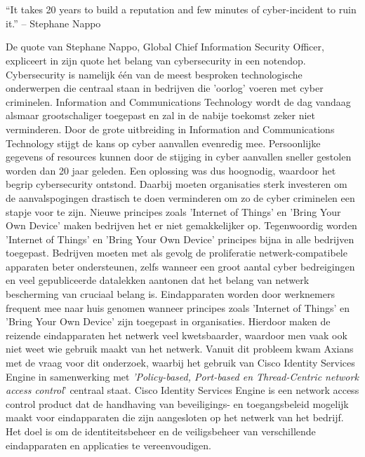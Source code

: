 
\chapter{}
\label{ch:inleiding}

\begin{displayquote}
	“It takes 20 years to build a reputation and few minutes of cyber-incident to ruin it.” – Stephane Nappo
\end{displayquote}

De quote van Stephane Nappo, Global Chief Information Security Officer, expliceert in zijn quote het belang van cybersecurity in een notendop. Cybersecurity is namelijk één van de meest besproken technologische onderwerpen die centraal staan in bedrijven die 'oorlog' voeren met cyber criminelen. Information and Communications Technology wordt de dag vandaag alsmaar grootschaliger toegepast en zal in de nabije toekomst zeker niet verminderen. Door de grote uitbreiding in Information and Communications Technology stijgt de kans op cyber aanvallen evenredig mee. Persoonlijke gegevens of resources kunnen door de stijging in cyber aanvallen sneller gestolen worden dan 20 jaar geleden. Een oplossing was dus hoognodig, waardoor het begrip cybersecurity ontstond. 
\newline
\newline
Daarbij moeten organisaties sterk investeren om de aanvalspogingen drastisch te doen verminderen om zo de cyber criminelen een stapje voor te zijn. Nieuwe principes zoals 'Internet of Things' en 'Bring Your Own Device' maken bedrijven het er niet gemakkelijker op. Tegenwoordig worden 'Internet of Things' en 'Bring Your Own Device' principes bijna in alle bedrijven toegepast. Bedrijven moeten met als gevolg de proliferatie netwerk-compatibele apparaten beter ondersteunen, zelfs wanneer een groot aantal cyber bedreigingen en veel gepubliceerde datalekken aantonen dat het belang van netwerk bescherming van cruciaal belang is. 
\newline
\newline
Eindapparaten worden door werknemers frequent mee naar huis genomen wanneer principes zoals 'Internet of Things' en 'Bring Your Own Device' zijn toegepast in organisaties. Hierdoor maken de reizende eindapparaten het netwerk veel kwetsbaarder, waardoor men vaak ook niet weet wie gebruik maakt van het netwerk. Vanuit dit probleem kwam Axians met de vraag voor dit onderzoek, waarbij het gebruik van Cisco Identity Services Engine in samenwerking met \textit{'Policy-based, Port-based en Thread-Centric network access control}' centraal staat. Cisco Identity Services Engine is een network access control product dat de handhaving van beveiligings- en toegangsbeleid mogelijk maakt voor eindapparaten die zijn aangesloten op het netwerk van het bedrijf. Het doel is om de identiteitsbeheer en de veiligsbeheer van verschillende eindapparaten en applicaties te vereenvoudigen. 
